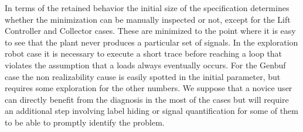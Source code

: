 In terms of the retained behavior the initial size of the specification determines whether the minimization can be manually inspected or not, except for the Lift Controller and Collector cases. These are minimized to the point where it is easy to see that the plant never produces a particular set of signals. In the exploration robot case it is necessary to execute a short trace before reaching a loop that violates the assumption that a loads always eventually occurs. For the Genbuf case the non realizability cause is easily spotted in the initial parameter, but requires some exploration for the other numbers. We suppose that a novice user can directly benefit from the diagnosis in the most of the cases but will require an additional step involving label hiding or signal quantification for some of them to be able to promptly identify the problem.
%
%
%
%
